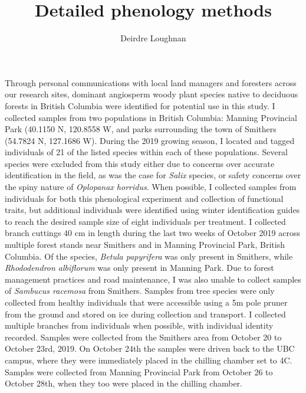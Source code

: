 \documentclass{article}\usepackage[]{graphicx}\usepackage[]{color}
\title{Detailed phenology methods }
\author{Deirdre Loughnan}
\begin{document}
\maketitle

Through personal communications with local land managers and foresters across our research sites, dominant angiosperm woody plant species native to deciduous forests in British Columbia were identified for potential use in this study. I collected samples from two populations in British Columbia: Manning Provincial Park (40.1150\textdegree{} N, 120.8558 \textdegree{} W, and parks surrounding the town of Smithers (54.7824\textdegree{} N, 127.1686\textdegree{} W). During the 2019 growing season, I located and tagged individuals of 21 of the listed species within each of these populations. Several species were excluded from this study either due to concerns over accurate identification in the field, as was the case for \emph{Salix} species, or safety concerns over the spiny nature of \emph{Oplopanax horridus}. When possible, I collected samples from individuals for both this phenological experiment and collection of functional traits, but additional individuals were identified using winter identification guides to reach the desired sample size of eight individuals per treatment. I collected branch cuttings 40 cm in length during the last two weeks of October 2019 across multiple forest stands near Smithers and in Manning Provincial Park, British Columbia. Of the species, \emph{Betula papyrifera} was only present in Smithers, while \emph{Rhododendron albiflorum} was only present in Manning Park. Due to forest management practices and road maintenance, I was also unable to collect samples of \emph{Sambucus racemosa} from Smithers. Samples from tree species were only collected from healthy individuals that were accessible using a 5m pole pruner from the ground and stored on ice during collection and transport. I collected multiple branches from individuals when possible, with individual identity recorded. Samples were collected from the Smithers area from October 20 to October 23rd, 2019. On October 24th the samples were driven back to the UBC campus, where they were immediately placed in the chilling chamber set to 4\textdegree{}C. Samples were collected from Manning Provincial Park from October 26 to October 28th, when they too were placed in the chilling chamber. 
\end{document}

